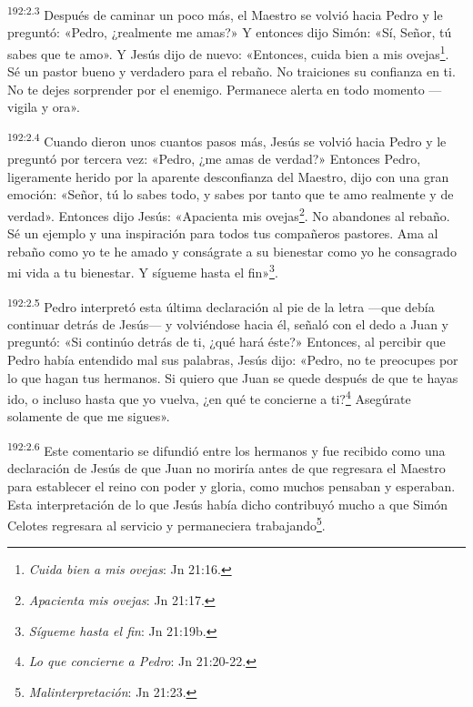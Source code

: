 \par
\textsuperscript{192:2.3} Después de caminar un poco más, el Maestro se volvió hacia Pedro y le preguntó: «Pedro, ¿realmente me amas?» Y entonces dijo Simón: «Sí, Señor, tú sabes que te amo». Y Jesús dijo de nuevo: «Entonces, cuida bien a mis ovejas\footnote{\textit{Cuida bien a mis ovejas}: Jn 21:16.}. Sé un pastor bueno y verdadero para el rebaño. No traiciones su confianza en ti. No te dejes sorprender por el enemigo. Permanece alerta en todo momento ---vigila y ora».

\par
\textsuperscript{192:2.4} Cuando dieron unos cuantos pasos más, Jesús se volvió hacia Pedro y le preguntó por tercera vez: «Pedro, ¿me amas de verdad?» Entonces Pedro, ligeramente herido por la aparente desconfianza del Maestro, dijo con una gran emoción: «Señor, tú lo sabes todo, y sabes por tanto que te amo realmente y de verdad». Entonces dijo Jesús: «Apacienta mis ovejas\footnote{\textit{Apacienta mis ovejas}: Jn 21:17.}. No abandones al rebaño. Sé un ejemplo y una inspiración para todos tus compañeros pastores. Ama al rebaño como yo te he amado y conságrate a su bienestar como yo he consagrado mi vida a tu bienestar. Y sígueme hasta el fin»\footnote{\textit{Sígueme hasta el fin}: Jn 21:19b.}.

\par
\textsuperscript{192:2.5} Pedro interpretó esta última declaración al pie de la letra ---que debía continuar detrás de Jesús--- y volviéndose hacia él, señaló con el dedo a Juan y preguntó: «Si continúo detrás de ti, ¿qué hará éste?» Entonces, al percibir que Pedro había entendido mal sus palabras, Jesús dijo: «Pedro, no te preocupes por lo que hagan tus hermanos. Si quiero que Juan se quede después de que te hayas ido, o incluso hasta que yo vuelva, ¿en qué te concierne a ti?\footnote{\textit{Lo que concierne a Pedro}: Jn 21:20-22.} Asegúrate solamente de que me sigues».

\par
\textsuperscript{192:2.6} Este comentario se difundió entre los hermanos y fue recibido como una declaración de Jesús de que Juan no moriría antes de que regresara el Maestro para establecer el reino con poder y gloria, como muchos pensaban y esperaban. Esta interpretación de lo que Jesús había dicho contribuyó mucho a que Simón Celotes regresara al servicio y permaneciera trabajando\footnote{\textit{Malinterpretación}: Jn 21:23.}.

